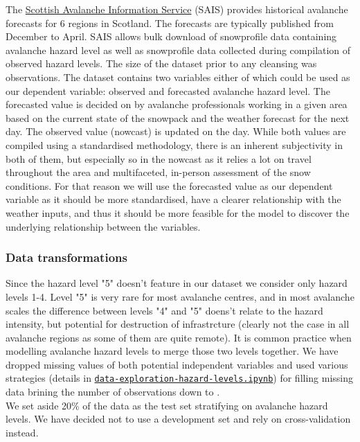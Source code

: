 \documentclass{article}
\begin{document}
	The \href{https://www.sais.gov.uk/forecast-archive/}{Scottish Avalanche Information Service} (SAIS) provides historical avalanche forecasts for 6 regions in Scotland. The forecasts are typically published from December to April. SAIS allows bulk download of snowprofile data containing avalanche hazard level as well as snowprofile data collected during compilation of observed hazard levels. The size of the dataset prior to any cleansing was observations.
	\newline
	The dataset contains two variables either of which could be used as our dependent variable: observed and forecasted avalanche hazard level.
	The forecasted value is decided on by avalanche professionals working in a given area based on the current state of the snowpack and the weather forecast for the next day.
	The observed value (nowcast) is updated on the day.
	\newline
	While both values are compiled using a standardised methodology, there is an inherent subjectivity in both of them, but especially so in the nowcast as it relies a lot on travel throughout the area and multifaceted, in-person assessment of the snow conditions. For that reason we will use the forecasted value as our dependent variable as it should be more standardised, have a clearer relationship with the weather inputs, and thus it should be more feasible for the model to discover the underlying relationship between the variables.

\subsubsection{Data transformations}
	Since the hazard level "5" doesn't feature in our dataset we consider only hazard levels 1-4. Level "5" is very rare for most avalanche centres, and in most avalanche scales the difference between levels "4" and "5" doens't relate to the hazard intensity, but potential for destruction of infrastrcture (clearly not the case in all avalanche regions as some of them are quite remote). It is common practice when modelling avalanche hazard levels to merge those two levels together. 
	We have dropped missing values of both potential independent variables and used various strategies (details in \href{https://github.com/witgaw/avalanche-danger-level-forecast/blob/project-report/src/data-exploration-hazard-levels.ipynb}{\texttt{data-exploration-hazard-levels.ipynb}}) for filling missing data brining the number of observations down to \unskip.\\
	\newline 
	We set aside 20\% of the data as the test set stratifying on avalanche hazard levels. We have decided not to use a development set and rely on cross-validation instead.
\end{document}
